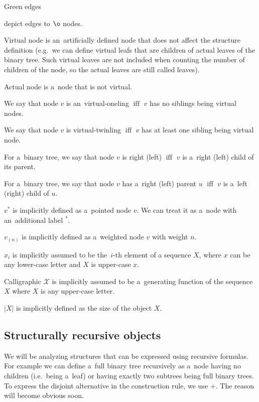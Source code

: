 \documentclass[final]{article}
\theoremstyle{definition}
\theoremstyle{definition}
\theoremstyle{remark}
\newcommand{\gf}[1]{\ensuremath{\mathcal{#1}}}
\newcommand{\pointed}[1]{\ensuremath{{#1}^*}}
\newcommand{\weighted}[1]{\ensuremath{_{(#1)}}}
\newcommand{\size}[1]{\ensuremath{\left|#1\right|}}
\DeclareMathOperator{\textiff}{\text{iff}}
\DeclareMathOperator{\no}{\o}
\begin{document}
Green edges 
\begin{minipage}{1.5em}

\end{minipage}
depict edges to \(\no\) nodes.

Virtual node is an~artificially defined node that does not affect the structure definition (e.g.~we can define virtual leafs that are children of actual leaves of the binary tree. Such virtual leaves are not included when counting the number of children of the node, so the actual leaves are still called leaves).

Actual node is a~node that is not virtual.

We say that node \(v\) is an~virtual-oneling \(\textiff\) \(v\) has no siblings being virtual nodes.

We say that node \(v\) is virtual-twinling \(\textiff\) \(v\) has at least one sibling being virtual node.

For a~binary tree, we say that node \(v\) is right (left) \(\textiff\) \(v\) is a~right (left) child of its parent.

For a~binary tree, we say that node \(v\) has a~right (left) parent \(u\) \(\textiff\) \(v\) is a~left (right) child of \(u\).

\(\pointed{v}\) is implicitly defined as a~pointed node \(v\). We can treat it as a~node with an~additional label \(\pointed{}\).

\(v\weighted{n}\) is implicitly defined as a~weighted node \(v\) with weight \(n\).

\(x_i\) is implicitly assumed to be the~\(i\)-th element of a sequence \(X\), where \(x\) can be any lower-case letter and \(X\) is upper-case \(x\).

Calligraphic \(\gf{X}\) is implicitly assumed to be a~generating function of the sequence \(X\) where \(X\) is any upper-case letter.

\(\size{X}\) is implicitly defined as the size of the object \(X\).

\subsection{Structurally recursive objects}%
\label{sub:structurally_recursive_objects}

We will be analyzing structures that can be expressed using recursive formulas. For example we can define a~full binary tree recursively as a~node having no children (i.e.~being a~leaf) or having exactly two subtrees being full binary trees. To express the disjoint alternative in the construction rule, we use \(+\). The reason will become obvious soon.
\end{document}
